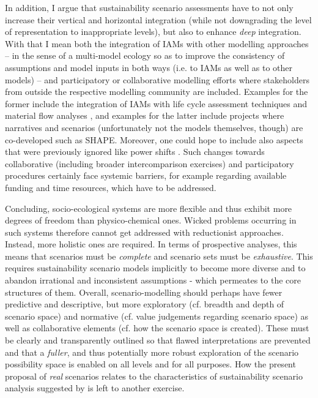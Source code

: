\documentclass{article}
\begin{document}
\begin{refsection}
In addition, I argue that sustainability scenario assessments have to not only increase their vertical and horizontal integration (while not downgrading the level of representation to inappropriate levels), but also to enhance \textit{deep} integration. With that I mean both the integration of IAMs with other modelling approaches -- in the sense of a multi-model ecology \parencite{bollinger_2015} so as to improve the consistency of assumptions and model inputs in both ways (i.e. to IAMs as well as to other models) -- and participatory or collaborative modelling efforts where stakeholders from outside the respective modelling community are included. Examples for the former include the integration of IAMs with life cycle assessment techniques \parencite[e.g.][]{luderer_2019} and material flow analyses \parencite[for an overview see:][]{baars_2022,kullmann_2021}, and examples for the latter include projects where narratives and scenarios (unfortunately not the models themselves, though) are co-developed such as SHAPE. Moreover, one could hope to include also aspects that were previously ignored like power shifts \parencite{rutting_2022}. Such changes towards collaborative (including broader intercomparison exercises) and participatory procedures certainly face systemic barriers, for example regarding available funding and time resources, which have to be addressed.

Concluding, socio-ecological systems are more flexible and thus exhibit more degrees of freedom than physico-chemical ones. Wicked problems occurring in such systems therefore cannot get addressed with reductionist approaches. Instead, more holistic ones are required. In terms of prospective analyses, this means that scenarios must be \textit{complete} and scenario sets must be \textit{exhaustive}. This requires sustainability scenario models implicitly to become more diverse and to abandon irrational and inconsistent assumptions - which permeates to the core structures of them. Overall, scenario-modelling should perhaps have fewer predictive and descriptive, but more exploratory (cf. breadth and depth of scenario space) and normative (cf. value judgements regarding scenario space) as well as collaborative elements (cf. how the scenario space is created). These must be clearly and transparently outlined so that flawed interpretations are prevented and that a \textit{fuller}, and thus potentially more robust exploration of the scenario possibility space is enabled on all levels and for all purposes. How the present proposal of \textit{real} scenarios relates to the characteristics of sustainability scenario analysis suggested by \textcite{swart_2004} is left to another exercise.





\end{refsection}
\end{document}

